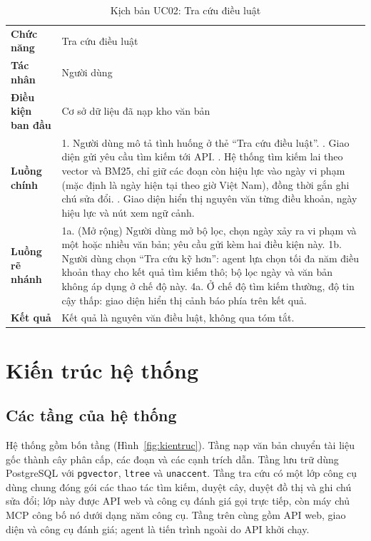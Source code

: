 \begin{table}[H]
\centering
\caption{Kịch bản UC02: Tra cứu điều luật}
\label{tab:uc-tracuu}
\footnotesize
\begin{tabularx}{\textwidth}{@{}>{\raggedright\arraybackslash}p{2.8cm} X@{}}
\toprule
\textbf{Chức năng} & Tra cứu điều luật \\
\textbf{Tác nhân} & Người dùng \\
\textbf{Điều kiện ban đầu} & Cơ sở dữ liệu đã nạp kho văn bản \\
\textbf{Luồng chính} & 1. Người dùng mô tả tình huống ở thẻ ``Tra cứu điều luật''. \newline
2. Giao diện gửi yêu cầu tìm kiếm tới API. \newline
3. Hệ thống tìm kiếm lai theo vector và BM25, chỉ giữ các đoạn còn hiệu lực vào ngày vi phạm (mặc định là ngày hiện tại theo giờ Việt Nam), đồng thời gắn ghi chú sửa đổi. \newline
4. Giao diện hiển thị nguyên văn từng điều khoản, ngày hiệu lực và nút xem ngữ cảnh. \\
\textbf{Luồng rẽ nhánh} & 1a. (Mở rộng) Người dùng mở bộ lọc, chọn ngày xảy ra vi phạm và một hoặc nhiều văn bản; yêu cầu gửi kèm hai điều kiện này. \newline
1b. Người dùng chọn ``Tra cứu kỹ hơn'': agent lựa chọn tối đa năm điều khoản thay cho kết quả tìm kiếm thô; bộ lọc ngày và văn bản không áp dụng ở chế độ này. \newline
4a. Ở chế độ tìm kiếm thường, độ tin cậy thấp: giao diện hiển thị cảnh báo phía trên kết quả. \\
\textbf{Kết quả} & Kết quả là nguyên văn điều luật, không qua tóm tắt. \\
\bottomrule
\end{tabularx}
\end{table}

\section{Kiến trúc hệ thống}
\label{sec:kientruc}

\subsection{Các tầng của hệ thống}

Hệ thống gồm bốn tầng (Hình~\ref{fig:kientruc}). Tầng nạp văn bản chuyển tài liệu gốc thành cây phân cấp, các đoạn và các cạnh trích dẫn. Tầng lưu trữ dùng PostgreSQL với \texttt{pgvector}, \texttt{ltree} và \texttt{unaccent}. Tầng tra cứu có một lớp công cụ dùng chung đóng gói các thao tác tìm kiếm, duyệt cây, duyệt đồ thị và ghi chú sửa đổi; lớp này được API web và công cụ đánh giá gọi trực tiếp, còn máy chủ MCP công bố nó dưới dạng năm công cụ. Tầng trên cùng gồm API web, giao diện và công cụ đánh giá; agent là tiến trình ngoài do API khởi chạy.

